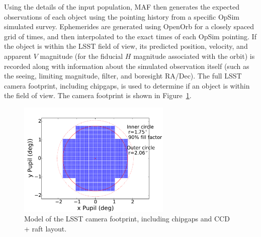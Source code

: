 Using the details of the input population, MAF then generates the expected observations of each object using the pointing history from a specific OpSim simulated survey. Ephemerides are generated using OpenOrb \citep{OpenOrb2009} for a closely spaced grid of times, and then interpolated to the exact times of each OpSim pointing. If the object is within the LSST field of view, its predicted position, velocity, and apparent $V$ magnitude (for the fiducial $H$ magnitude associated with the orbit) is recorded along with information about the simulated observation itself (such as the seeing, limiting magnitude, filter, and boresight RA/Dec). The full LSST camera footprint, including chipgaps, is used to determine if an object is within the field of view. The camera footprint is shown in Figure~\ref{fig:camera_footprint}. 

\begin{figure}
\centering
\includegraphics[width=0.65\textwidth]{figures/focalplane} 
\caption{Model of the LSST camera footprint, including chipgaps and CCD + raft layout. \label{fig:camera_footprint}}
\end{figure}


